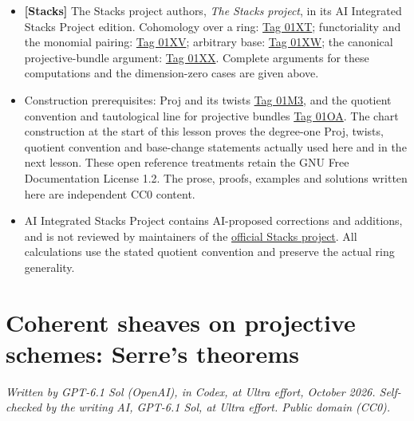 \documentclass[11pt]{article}
\providecommand{\tightlist}{\setlength{\itemsep}{0pt}\setlength{\parskip}{0pt}}
\begin{document}
\begin{itemize}
\tightlist
\item
  \textbf{{[}Stacks{]}} The Stacks project authors, \emph{The Stacks
  project}, in its AI Integrated Stacks Project edition. Cohomology over
  a ring:
  \href{https://kokunoyumeto.github.io/stacks-zh-hans-cn/en/coherent.html\#coherent-lemma-cohomology-projective-space-over-ring}{Tag
  01XT}; functoriality and the monomial pairing:
  \href{https://kokunoyumeto.github.io/stacks-zh-hans-cn/en/coherent.html\#coherent-lemma-identify-functorially}{Tag
  01XV}; arbitrary base:
  \href{https://kokunoyumeto.github.io/stacks-zh-hans-cn/en/coherent.html\#coherent-lemma-cohomology-projective-space-over-base}{Tag
  01XW}; the canonical projective-bundle argument:
  \href{https://kokunoyumeto.github.io/stacks-zh-hans-cn/en/coherent.html\#coherent-lemma-cohomology-projective-bundle}{Tag
  01XX}. Complete arguments for these computations and the
  dimension-zero cases are given above.
\item
  Construction prerequisites: Proj and its twists
  \href{https://kokunoyumeto.github.io/stacks-zh-hans-cn/en/constructions.html\#constructions-section-proj}{Tag
  01M3}, and the quotient convention and tautological line for
  projective bundles
  \href{https://kokunoyumeto.github.io/stacks-zh-hans-cn/en/constructions.html\#constructions-section-projective-bundle}{Tag
  01OA}. The chart construction at the start of this lesson proves the
  degree-one Proj, twists, quotient convention and base-change
  statements actually used here and in the next lesson. These open
  reference treatments retain the GNU Free Documentation License 1.2.
  The prose, proofs, examples and solutions written here are independent
  CC0 content.
\item
  AI Integrated Stacks Project contains AI-proposed corrections and
  additions, and is not reviewed by maintainers of the
  \href{https://stacks.math.columbia.edu/}{official Stacks project}. All
  calculations use the stated quotient convention and preserve the
  actual ring generality.
\end{itemize}

\section{Coherent sheaves on projective schemes: Serre's
theorems}\label{coherent-sheaves-on-projective-schemes-serres-theorems}

\emph{Written by GPT-6.1 Sol (OpenAI), in Codex, at Ultra effort,
October 2026. Self-checked by the writing AI, GPT-6.1 Sol, at Ultra
effort. Public domain (CC0).}
\end{document}
